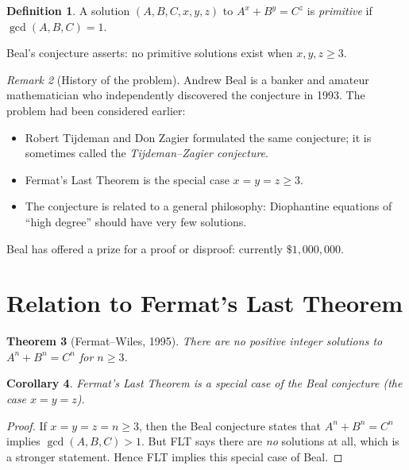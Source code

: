 \documentclass[12pt,a4paper]{amsart}
\newtheorem{theorem}{Theorem}[section]
\newtheorem{corollary}[theorem]{Corollary}
\theoremstyle{definition}
\newtheorem{definition}[theorem]{Definition}
\theoremstyle{remark}
\newtheorem{remark}[theorem]{Remark}
\begin{document}
\begin{definition}
A solution $(A, B, C, x, y, z)$ to $A^x + B^y = C^z$ is \emph{primitive} if
$\gcd(A, B, C) = 1$.
\end{definition}

Beal's conjecture asserts: no primitive solutions exist when $x, y, z \geq 3$.

\begin{remark}[History of the problem]
Andrew Beal is a banker and amateur mathematician who independently discovered
the conjecture in 1993. The problem had been considered earlier:
\begin{itemize}
  \item Robert Tijdeman and Don Zagier formulated the same conjecture; it is
        sometimes called the \emph{Tijdeman--Zagier conjecture}.
  \item Fermat's Last Theorem is the special case $x = y = z \geq 3$.
  \item The conjecture is related to a general philosophy: Diophantine equations
        of ``high degree'' should have very few solutions.
\end{itemize}
Beal has offered a prize for a proof or disproof: currently $\$1{,}000{,}000$.
\end{remark}

\section{Relation to Fermat's Last Theorem}

\begin{theorem}[Fermat--Wiles, 1995]\label{thm:FLT}
There are no positive integer solutions to $A^n + B^n = C^n$ for $n \geq 3$.
\end{theorem}

\begin{corollary}
Fermat's Last Theorem is a special case of the Beal conjecture (the case $x = y = z$).
\end{corollary}

\begin{proof}
If $x = y = z = n \geq 3$, then the Beal conjecture states that $A^n + B^n = C^n$
implies $\gcd(A,B,C) > 1$. But FLT says there are \emph{no} solutions at all,
which is a stronger statement. Hence FLT implies this special case of Beal.
\end{proof}
\end{document}
